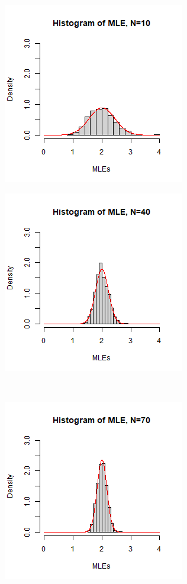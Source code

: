 \begin{figure}[h]
    \centering
    \begin{subfigure}
        \centering
        \includegraphics[scale=0.45]{../../../misc/N10.jpg}
    \end{subfigure}
    \begin{subfigure}
        \centering
        \includegraphics[scale=0.45]{../../../misc/N40.jpg}
    \end{subfigure}\\
    \begin{subfigure}
        \centering
        \includegraphics[scale=0.45]{../../../misc/N70.jpg}

\end{subfigure}
\end{figure}
